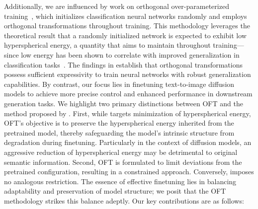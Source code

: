 Additionally, we are influenced by work on orthogonal over-parameterized training~\cite{liu2021orthogonal}, which initializes classification neural networks randomly and employs orthogonal transformations throughout training. This methodology leverages the theoretical result that a randomly initialized network is expected to exhibit low hyperspherical energy, a quantity that \cite{liu2021orthogonal} aims to maintain throughout training—since low energy has been shown to correlate with improved generalization in classification tasks~\cite{liu2018learning,lin2020regularizing}. The findings in \cite{liu2021orthogonal} establish that orthogonal transformations possess sufficient expressivity to train neural networks with robust generalization capabilities. By contrast, our focus lies in finetuning text-to-image diffusion models to achieve more precise control and enhanced performance in downstream generation tasks. We highlight two primary distinctions between OFT and the method proposed by \cite{liu2021orthogonal}. First, while \cite{liu2021orthogonal} targets minimization of hyperspherical energy, OFT’s objective is to preserve the hyperspherical energy inherited from the pretrained model, thereby safeguarding the model’s intrinsic structure from degradation during finetuning. Particularly in the context of diffusion models, an aggressive reduction of hyperspherical energy may be detrimental to original semantic information. Second, OFT is formulated to limit deviations from the pretrained configuration, resulting in a constrained approach. Conversely, \cite{liu2021orthogonal} imposes no analogous restriction. The essence of effective finetuning lies in balancing adaptability and preservation of model structure; we posit that the OFT methodology strikes this balance adeptly. Our key contributions are as follows:

